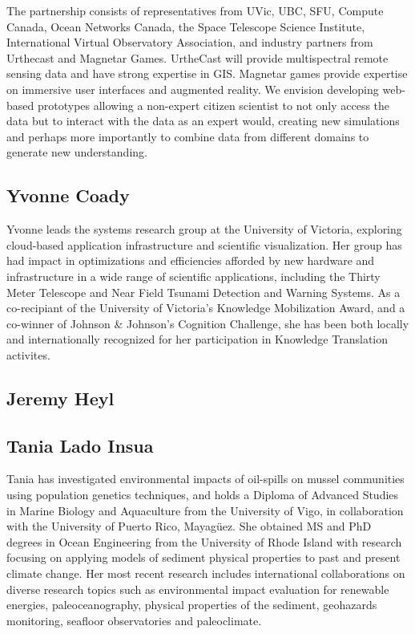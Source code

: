 



The partnership consists of representatives from UVic, UBC, SFU,
Compute Canada, Ocean Networks Canada, the Space Telescope Science
Institute, International Virtual Observatory Association, and industry
partners from Urthecast and Magnetar Games.  UrtheCast will provide
multispectral remote sensing data and have strong expertise in GIS.
Magnetar games provide expertise on immersive user interfaces and
augmented reality.  We envision developing web-based prototypes
allowing a non-expert citizen scientist to not only access the data
but to interact with the data as an expert would, creating new
simulations and perhaps more importantly to combine data from
different domains to generate new understanding.

\subsection*{Yvonne Coady} 
Yvonne leads the systems research group at the University of Victoria, exploring cloud-based application infrastructure and scientific visualization.  Her group has had impact in optimizations and efficiencies afforded by new hardware and infrastructure in a wide range of scientific applications, including the Thirty Meter Telescope and Near Field Tsunami Detection and Warning Systems.  As a co-recipiant of the University of Victoria's Knowledge Mobilization Award, and a co-winner of Johnson & Johnson's Cognition Challenge, she has been both locally and internationally recognized for her participation in Knowledge Translation activites.


\subsection*{Jeremy Heyl}

\subsection*{Tania Lado Insua}
Tania has investigated environmental impacts of oil-spills on mussel communities using population genetics techniques, and holds a Diploma of Advanced Studies in Marine Biology and Aquaculture from the University of Vigo, in collaboration with the University of Puerto Rico, Mayagüez.  She obtained MS and PhD degrees in Ocean Engineering from the University of Rhode Island with research focusing on applying models of sediment physical properties to past and present climate change. Her most recent research includes international collaborations on diverse research topics such as environmental impact evaluation for renewable energies, paleoceanography, physical properties of the sediment, geohazards monitoring, seafloor observatories and paleoclimate. 


